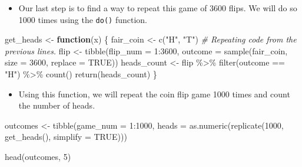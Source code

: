\documentclass[
]{book}
\newenvironment{Shaded}{\begin{snugshade}}{\end{snugshade}}
\newcommand{\AttributeTok}[1]{\textcolor[rgb]{0.77,0.63,0.00}{#1}}
\newcommand{\CommentTok}[1]{\textcolor[rgb]{0.56,0.35,0.01}{\textit{#1}}}
\newcommand{\ConstantTok}[1]{\textcolor[rgb]{0.00,0.00,0.00}{#1}}
\newcommand{\ControlFlowTok}[1]{\textcolor[rgb]{0.13,0.29,0.53}{\textbf{#1}}}
\newcommand{\DecValTok}[1]{\textcolor[rgb]{0.00,0.00,0.81}{#1}}
\newcommand{\FunctionTok}[1]{\textcolor[rgb]{0.00,0.00,0.00}{#1}}
\newcommand{\NormalTok}[1]{#1}
\newcommand{\OtherTok}[1]{\textcolor[rgb]{0.56,0.35,0.01}{#1}}
\newcommand{\SpecialCharTok}[1]{\textcolor[rgb]{0.00,0.00,0.00}{#1}}
\newcommand{\StringTok}[1]{\textcolor[rgb]{0.31,0.60,0.02}{#1}}
\providecommand{\tightlist}{%
  \setlength{\itemsep}{0pt}\setlength{\parskip}{0pt}}
\begin{document}
\begin{itemize}
\tightlist
\item
  Our last step is to find a way to repeat this game of 3600 flips. We will do so 1000 times using the \texttt{do()} function.
\end{itemize}

\begin{Shaded}
\begin{Highlighting}[]
\NormalTok{get\_heads }\OtherTok{\textless{}{-}} \ControlFlowTok{function}\NormalTok{(x) \{}
\NormalTok{  fair\_coin }\OtherTok{\textless{}{-}} \FunctionTok{c}\NormalTok{(}\StringTok{"H"}\NormalTok{, }\StringTok{"T"}\NormalTok{) }\CommentTok{\# Repeating code from the previous lines.}
\NormalTok{  flip }\OtherTok{\textless{}{-}} \FunctionTok{tibble}\NormalTok{(}\AttributeTok{flip\_num =} \DecValTok{1}\SpecialCharTok{:}\DecValTok{3600}\NormalTok{, }
                 \AttributeTok{outcome =} \FunctionTok{sample}\NormalTok{(fair\_coin, }\AttributeTok{size =} \DecValTok{3600}\NormalTok{, }\AttributeTok{replace =} \ConstantTok{TRUE}\NormalTok{))}
\NormalTok{  heads\_count }\OtherTok{\textless{}{-}}\NormalTok{ flip }\SpecialCharTok{\%\textgreater{}\%} \FunctionTok{filter}\NormalTok{(outcome }\SpecialCharTok{==} \StringTok{"H"}\NormalTok{) }\SpecialCharTok{\%\textgreater{}\%} \FunctionTok{count}\NormalTok{()}
  \FunctionTok{return}\NormalTok{(heads\_count)}
\NormalTok{\}}
\end{Highlighting}
\end{Shaded}

\begin{itemize}
\tightlist
\item
  Using this function, we will repeat the coin flip game 1000 times and count the number of heads.
\end{itemize}

\begin{Shaded}
\begin{Highlighting}[]
\NormalTok{outcomes }\OtherTok{\textless{}{-}} \FunctionTok{tibble}\NormalTok{(}\AttributeTok{game\_num =} \DecValTok{1}\SpecialCharTok{:}\DecValTok{1000}\NormalTok{,}
                   \AttributeTok{heads =} \FunctionTok{as.numeric}\NormalTok{(}\FunctionTok{replicate}\NormalTok{(}\DecValTok{1000}\NormalTok{, }\FunctionTok{get\_heads}\NormalTok{(), }\AttributeTok{simplify =} \ConstantTok{TRUE}\NormalTok{))) }

\FunctionTok{head}\NormalTok{(outcomes, }\DecValTok{5}\NormalTok{)}
\end{Highlighting}
\end{Shaded}
\end{document}
